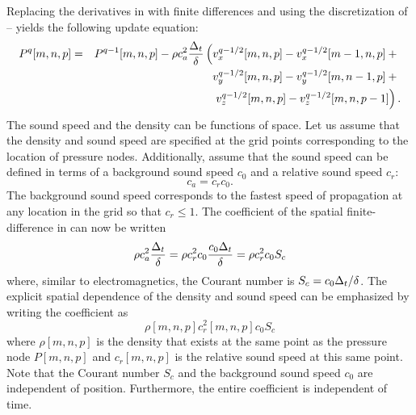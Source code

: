 Replacing the derivatives in  with finite differences
and using the discretization of --
yields the following update equation:
\begin{eqnarray}
P^q[m,n,p] & = & P^{q-1}[m,n,p] -
        \rho c_a^2 \frac{\Delta_t}{\delta}
        \left(v_x^{q-1/2}[m,n,p]-v_x^{q-1/2}[m-1,n,p]+\mbox{}\right.
        \nonumber \\
&&                 
       	\:\,\,\,\,\quad\qquad\qquad\qquad\qquad
	\left.v_y^{q-1/2}[m,n,p]-v_y^{q-1/2}[m,n-1,p]+\mbox{}\right.
        \nonumber \\
&&                 
        \:\,\,\,\,\quad\qquad\qquad\qquad\qquad
        \left. v_z^{q-1/2}[m,n,p]-v_z^{q-1/2}[m,n,p-1]\right).
                            \label{eq:p-update}
\end{eqnarray}
The sound speed and the density can be functions of space.  Let us
assume that the density and sound speed are specified at the grid
points corresponding to the location of pressure nodes.  Additionally,
assume that the sound speed can be defined in terms of a background
sound speed $c_0$ and a relative sound speed $c_r$:
\begin{equation}
  c_a=c_rc_0.
\end{equation}
The background sound speed corresponds to the fastest speed of
propagation at any location in the grid so that $c_r\leq 1$.  The
coefficient of the spatial finite-difference in
 can now be written
\begin{equation}
  \rho c_a^2 \frac{\Delta_t}{\delta} = 
  \rho c_r^2 c_0\frac{c_0\Delta_t}{\delta} = 
  \rho c_r^2 c_0 S_c 
\end{equation}
where, similar to electromagnetics, the Courant number is
$S_c=c_0\Delta_t/\delta$.  The explicit spatial dependence of the
density and sound speed can be emphasized by writing the coefficient
as 
\begin{equation}
  \rho[m,n,p] c_r^2[m,n,p] c_0 S_c
\end{equation}
where $\rho[m,n,p]$ is the density that exists at the same point as
the pressure node $P[m,n,p]$ and $c_r[m,n,p]$ is the relative sound
speed at this same point.  Note that the Courant number $S_c$ and the
background sound speed $c_0$ are independent of position.
Furthermore, the entire coefficient is independent of time.

